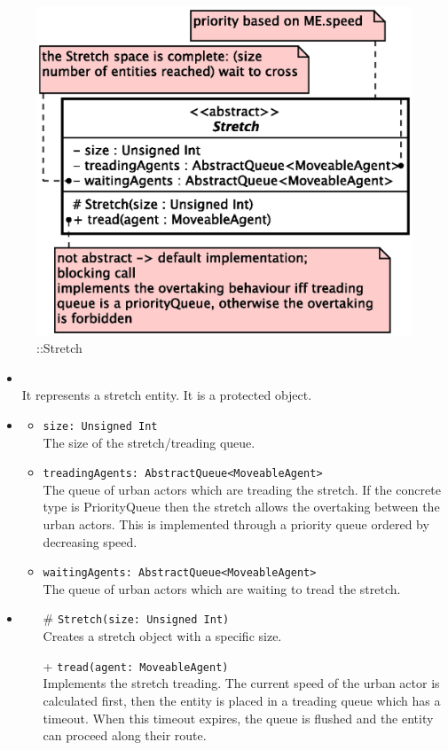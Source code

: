\begin{figure}[h]
\centering
\includegraphics[scale=0.6,keepaspectratio]{images/solution/app/backend/stretch.eps}
\caption{\pReactiveComponentStretch::Stretch}
\label{fig:sd-app-stretch}
\end{figure}
\FloatBarrier
\begin{itemize}
  \item \textbf{\descr} \\
    It represents a stretch entity. It is a protected object.
  \item \textbf{\attrs}
  \begin{itemize}
    \item \texttt{size: Unsigned Int} \\
The size of the stretch/treading queue.
    \item \texttt{treadingAgents: AbstractQueue<MoveableAgent>} \\
The queue of urban actors which are treading the stretch. If the concrete type
is PriorityQueue then the stretch allows the overtaking between the urban actors.
This is implemented through a priority queue ordered by decreasing speed.
    \item \texttt{waitingAgents: AbstractQueue<MoveableAgent>} \\
The queue of urban actors which are waiting to tread the stretch. 
  \end{itemize}
  \item \textbf{\ops}
  \begin{itemize}
    \item[\#] \texttt{Stretch(size: Unsigned Int)} \\
Creates a stretch object with a specific size.
    \item[+] \texttt{tread(agent: MoveableAgent)} \\
Implements the stretch treading. The current speed of the urban actor
is calculated first, then the entity is placed in a treading queue which has a  
timeout. When this timeout expires, the queue is flushed and the entity can
proceed along their route.
  \end{itemize}
\end{itemize}
